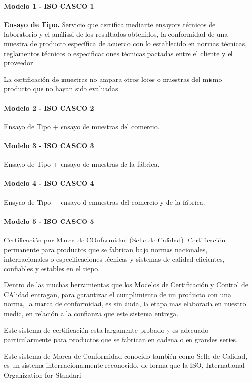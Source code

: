 \paragraph{Modelo 1 - ISO CASCO 1}

\textbf{Ensayo de Tipo.} Servicio que certifica mediante ensayors técnicos de laboratorio y el análissi de los resultados obtenidos, la conformidad de una muestra de producto específica de acuerdo con lo establecido en normas técnicas, reglamentos técnicos o especificaciones técnicas pactadas entre el cliente y el proveedor.

La certificación de muestras no ampara otros lotes o muestras del mismo producto que no hayan sido evaluadas.

\paragraph{Modelo 2 - ISO CASCO 2}
Ensayo de Tipo + ensayo de muestras del comercio.

\paragraph{Modelo 3 - ISO CASCO 3}
Ensayo de Tipo + ensayo de muestras de la fábrica.

\paragraph{Modelo 4 - ISO CASCO 4}
Ensyao de Tipo + ensayo d emuestras del comercio y de la fábrica.

\paragraph{Modelo 5 - ISO CASCO 5}
Certificación por Marca de COnformidad (Sello de Calidad). Certificación permanente para productos que se fabrican bajo normas nacionales, internacionales o especificaciones técnicas y sistemas de calidad eficientes, confiables y estables en el tiepo. 

Dentro de las muchas herramientas que los Modelos de Certificación y Control de CAlidad entragan, para garantizar el cumplimiento de un producto con una norma, la marca de conformidad, es sin duda, la etapa mas elaborada en nuestro medio, en relación a la confianza que este sistema entrega.

Este sistema de certificación esta largamente probado y es adecuado particularmente para productos que se fabrican en cadena o en grandes series.

Este sistema de Marca de Conformidad conocido también como Sello de Calidad, es un sistema internacionalmente reconocido, de forma que la ISO, International Organization for Standari